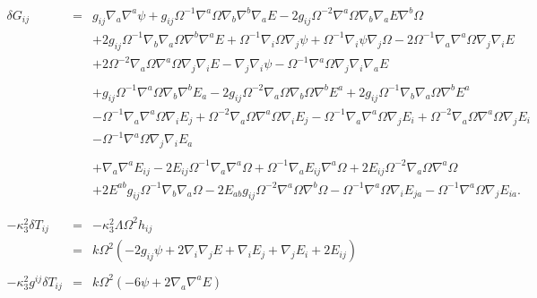 \documentclass[10pt,letterpaper]{article}
\numberwithin{equation}{section}
\begin{document}
\begin{eqnarray}
\delta G_{ij}&=&g_{ij} \nabla_{a}\nabla^{a}\psi
 + g_{ij} \Omega^{-1} \nabla^{a}\Omega \nabla_{b}\nabla^{b}\nabla_{a}E
 - 2 g_{ij} \Omega^{-2} \nabla^{a}\Omega \nabla_{b}\nabla_{a}E \nabla^{b}\Omega\nonumber\\
&& + 2 g_{ij} \Omega^{-1} \nabla_{b}\nabla_{a}\Omega \nabla^{b}\nabla^{a}E
 + \Omega^{-1} \nabla_{i}\Omega \nabla_{j}\psi
 + \Omega^{-1} \nabla_{i}\psi \nabla_{j}\Omega
 - 2 \Omega^{-1} \nabla_{a}\nabla^{a}\Omega \nabla_{j}\nabla_{i}E\nonumber\\
&& + 2 \Omega^{-2} \nabla_{a}\Omega \nabla^{a}\Omega \nabla_{j}\nabla_{i}E
 -  \nabla_{j}\nabla_{i}\psi
 -  \Omega^{-1} \nabla^{a}\Omega \nabla_{j}\nabla_{i}\nabla_{a}E
\nonumber\\ \nonumber\\
&&+g_{ij} \Omega^{-1} \nabla^{a}\Omega \nabla_{b}\nabla^{b}E_{a}
 - 2 g_{ij} \Omega^{-2} \nabla_{a}\Omega \nabla_{b}\Omega \nabla^{b}E^{a}
 + 2 g_{ij} \Omega^{-1} \nabla_{b}\nabla_{a}\Omega \nabla^{b}E^{a}\nonumber\\
&& -  \Omega^{-1} \nabla_{a}\nabla^{a}\Omega \nabla_{i}E_{j}
 + \Omega^{-2} \nabla_{a}\Omega \nabla^{a}\Omega \nabla_{i}E_{j}
 -  \Omega^{-1} \nabla_{a}\nabla^{a}\Omega \nabla_{j}E_{i}
 + \Omega^{-2} \nabla_{a}\Omega \nabla^{a}\Omega \nabla_{j}E_{i}\nonumber\\
&& -  \Omega^{-1} \nabla^{a}\Omega \nabla_{j}\nabla_{i}E_{a}
\nonumber \\ \nonumber\\
&&+\nabla_{a}\nabla^{a}E_{ij}
 - 2 E_{ij} \Omega^{-1} \nabla_{a}\nabla^{a}\Omega
 + \Omega^{-1} \nabla_{a}E_{ij} \nabla^{a}\Omega
 + 2 E_{ij} \Omega^{-2} \nabla_{a}\Omega \nabla^{a}\Omega\nonumber\\
&& + 2 E^{ab} g_{ij} \Omega^{-1} \nabla_{b}\nabla_{a}\Omega
 - 2 E_{ab} g_{ij} \Omega^{-2} \nabla^{a}\Omega \nabla^{b}\Omega
 -  \Omega^{-1} \nabla^{a}\Omega \nabla_{i}E_{ja}
 -  \Omega^{-1} \nabla^{a}\Omega \nabla_{j}E_{ia}.
\label{dgcfsvt}\\
\nonumber\\ \nonumber\\
-\kappa_3^2 \delta T_{ij} &=& -\kappa^2_3 \Lambda \Omega^2 h_{ij}
\nonumber\\
&=& k \Omega^2 (-2 g_{ij}\psi + 2\nabla_i\nabla_j E + \nabla_i E_j + \nabla_j E_i + 2E_{ij})
\nonumber\\ \nonumber\\
-\kappa_3^2 g^{ij} \delta T_{ij} &=& k\Omega^2(-6\psi + 2\nabla_a\nabla^a E)
\end{eqnarray}
\end{document}
